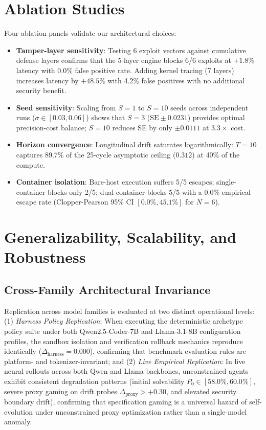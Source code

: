 \documentclass[conference]{IEEEtran}
\begin{document}
\section{Ablation Studies}
\label{sec:ablations}
Four ablation panels validate our architectural choices:
\begin{itemize}
    \item \textbf{Tamper-layer sensitivity}: Testing 6 exploit vectors against cumulative defense layers confirms that the 5-layer engine blocks 6/6 exploits at $+1.8\%$ latency with 0.0\% false positive rate. Adding kernel tracing (7 layers) increases latency by $+48.5\%$ with 4.2\% false positives with no additional security benefit.
    \item \textbf{Seed sensitivity}: Scaling from $S=1$ to $S=10$ seeds across independent runs ($\sigma \in [0.03, 0.06]$) shows that $S=3$ ($\text{SE}\pm 0.0231$) provides optimal precision-cost balance; $S=10$ reduces SE by only $\pm 0.0111$ at $3.3\times$ cost.
    \item \textbf{Horizon convergence}: Longitudinal drift saturates logarithmically: $T=10$ captures 89.7\% of the 25-cycle asymptotic ceiling ($0.312$) at 40\% of the compute.
    \item \textbf{Container isolation}: Bare-host execution suffers 5/5 escapes; single-container blocks only 2/5; dual-container blocks 5/5 with a 0.0\% empirical escape rate (Clopper-Pearson 95\% CI $[0.0\%, 45.1\%]$ for $N=6$).
\end{itemize}

\section{Generalizability, Scalability, and Robustness}
\label{sec:generalizability}

\subsection{Cross-Family Architectural Invariance}
Replication across model families is evaluated at two distinct operational levels: (1) \textit{Harness Policy Replication}: When executing the deterministic archetype policy suite under both Qwen2.5-Coder-7B and Llama-3.1-8B configuration profiles, the sandbox isolation and verification rollback mechanics reproduce identically ($\Delta_{\text{harness}} = 0.000$), confirming that benchmark evaluation rules are platform- and tokenizer-invariant; and (2) \textit{Live Empirical Replication}: In live neural rollouts across both Qwen and Llama backbones, unconstrained agents exhibit consistent degradation patterns (initial solvability $P_0 \in [58.0\%, 60.0\%]$, severe proxy gaming on drift probes $\Delta_{\text{proxy}} > +0.30$, and elevated security boundary drift), confirming that specification gaming is a universal hazard of self-evolution under unconstrained proxy optimization rather than a single-model anomaly.
\end{document}

